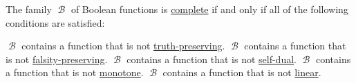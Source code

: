 \begin{theorem}\label{thm:posts_completeness_theorem}
  The family \( \mscrB \) of Boolean functions is \hyperref[def:boolean_closure]{complete} if and only if all of the following conditions are satisfied:
  \begin{thmenum}
     \( \mscrB \) contains a function that is not \hyperref[def:boolean_functions_in_f2/truth_preserving]{truth-preserving}.
     \( \mscrB \) contains a function that is not \hyperref[def:boolean_functions_in_f2/falsity_preserving]{falsity-preserving}.
     \( \mscrB \) contains a function that is not \hyperref[def:boolean_functions_in_f2/self_dual]{self-dual}.
     \( \mscrB \) contains a function that is not \hyperref[def:boolean_functions_in_f2/monotone]{monotone}.
     \( \mscrB \) contains a function that is not \hyperref[def:boolean_functions_in_f2/linear]{linear}.
  \end{thmenum}
\end{theorem}

